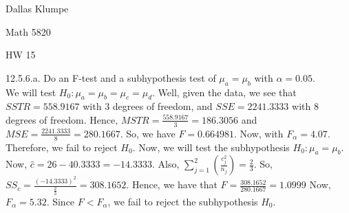 \documentclass[12pt]{article}
\begin{document}
\noindent Dallas Klumpe

\noindent Math 5820

\noindent HW 15

12.5.6.a. Do an F-test and a subhypothesis test of $\mu_a=\mu_b$ with $\alpha=0.05$.\\
We will test $H_0:\mu_a=\mu_b=\mu_c=\mu_d$. Well, given the data, we see that $SSTR=558.9167$ with $3$ degrees of freedom, and $SSE=2241.3333$ with $8$ degrees of freedom. Hence, $MSTR=\frac{558.9167}{3}=186.3056$ and $MSE=\frac{2241.3333}{8}=280.1667$. So, we have $F=0.664981$. Now, with $F_{\alpha}=4.07$. Therefore, we fail to reject $H_0$. Now, we will test the subhypothesis $H_0:\mu_a=\mu_b$. Now, $\hat{c}=26-40.3333=-14.3333$. Also, $\sum_{j=1}^2(\frac{c_j^2}{n_j})=\frac23$. So, $SS_c=\frac{(-14.3333)^2}{\frac23}=308.1652$. Hence, we have that $F=\frac{308.1652}{280.1667}=1.0999$ Now, $F_{\alpha}=5.32$. Since $F<F_{\alpha}$, we fail to reject the subhypothesis $H_0$.
\end{document}
